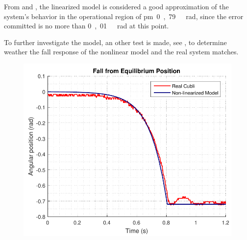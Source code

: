 From  and , the linearized model is considered a good approximation of the system's behavior in the operational region of \si{\pm 0,79\ rad}, since the error committed is no more than \si{0,01\ rad} at this point.

To further investigate the model, an other test is made, see , to determine weather the fall response of the nonlinear model and the real system matches.

\begin{minipage}{\linewidth}
	\begin{minipage}{0.5\linewidth}
		\begin{figure}[H]
			\includegraphics[scale=.55]{figures/FallTestComparison}
			\centering
			\captionsetup{justification=centering}
			\label{FallTestComparison}
		\end{figure}%
	\end{minipage}
	\begin{minipage}{0.5\linewidth}
		\begin{figure}[H]%

\end{figure}
\end{minipage}
\end{minipage}
